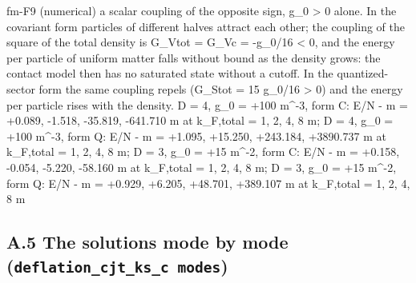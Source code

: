 \documentclass[
  10pt,
]{article}
\newenvironment{Shaded}{}{}
\newcommand{\NormalTok}[1]{#1}
\begin{document}
\begin{Shaded}
\begin{Highlighting}[]
\NormalTok{[PASS] fm{-}F9  (numerical) a scalar coupling of the opposite sign, g\_0 \textgreater{} 0 alone. In the covariant form particles of different halves attract each other; the coupling of the square of the total density is G\_Vtot = G\_Vc = {-}g\_0/16 \textless{} 0, and the energy per particle of uniform matter falls without bound as the density grows: the contact model then has no saturated state without a cutoff. In the quantized{-}sector form the same coupling repels (G\_Stot = 15 g\_0/16 \textgreater{} 0) and the energy per particle rises with the density. D = 4, g\_0 = +100 m\^{}{-}3, form C: E/N {-} m = +0.089, {-}1.518, {-}35.819, {-}641.710 m at k\_F,total = 1, 2, 4, 8 m; D = 4, g\_0 = +100 m\^{}{-}3, form Q: E/N {-} m = +1.095, +15.250, +243.184, +3890.737 m at k\_F,total = 1, 2, 4, 8 m; D = 3, g\_0 = +15 m\^{}{-}2, form C: E/N {-} m = +0.158, {-}0.054, {-}5.220, {-}58.160 m at k\_F,total = 1, 2, 4, 8 m; D = 3, g\_0 = +15 m\^{}{-}2, form Q: E/N {-} m = +0.929, +6.205, +48.701, +389.107 m at k\_F,total = 1, 2, 4, 8 m}
\end{Highlighting}
\end{Shaded}

\hypertarget{a.5-the-solutions-mode-by-mode-deflation_cjt_ks_c-modes}{%
\subsection{\texorpdfstring{A.5 The solutions mode by mode
(\texttt{deflation\_cjt\_ks\_c\ modes})}{A.5 The solutions mode by mode (deflation\_cjt\_ks\_c modes)}}\label{a.5-the-solutions-mode-by-mode-deflation_cjt_ks_c-modes}}
\end{document}
